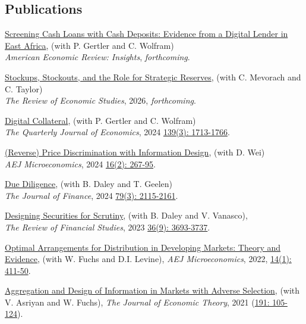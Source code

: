 \documentclass[margin,line,11pt]{resume}
\begin{document}
\begin{resume}
    \section{\mysidestyle Publications }

    \href{https://papers.ssrn.com/abstract=6439659}{Screening Cash Loans with Cash Deposits: Evidence from a Digital Lender in East Africa}, (with P. Gertler and C. Wolfram) \\
\emph{American Economic Review: Insights}, \emph{forthcoming}.


    \href{https://papers.ssrn.com/sol3/papers.cfm?abstract_id=4491921}{Stockups, Stockouts, and the Role for Strategic Reserves}, (with C. Mevorach and C. Taylor) \\
\emph{The Review of Economic Studies}, 2026, \emph{forthcoming}.


    \href{https://papers.ssrn.com/sol3/papers.cfm?abstract_id=3821998}{Digital Collateral}, (with P. Gertler and C. Wolfram)
\\\emph{The Quarterly Journal of Economics}, 2024 \href{https://doi.org/10.1093/qje/qjae003}{139(3): 1713-1766}.


     \href{https://papers.ssrn.com/sol3/Papers.cfm?abstract_id=3263898}{(Reverse) Price Discrimination with Information Design}, (with D. Wei)
 \\\emph{AEJ Microeconomics}, 2024 \href{https://www.aeaweb.org/articles?id=10.1257/mic.20220242}{16(2): 267-95}.


    \href{https://papers.ssrn.com/sol3/papers.cfm?abstract_id=3702560}{Due Diligence}, (with B. Daley and T. Geelen)
\\\emph{The Journal of Finance}, 2024 \href{https://doi.org/10.1111/jofi.13322}{79(3): 2115-2161}.


\href{https://papers.ssrn.com/sol3/papers.cfm?abstract_id=2940791}{Designing Securities for Scrutiny}, (with B. Daley and V. Vanasco), \\\emph{The Review of Financial Studies}, 2023 \href{https://doi.org/10.1093/rfs/hhad013}{36(9): 3693-3737}.


\href{https://papers.ssrn.com/sol3/papers.cfm?abstract_id=2957288}{Optimal Arrangements for Distribution in Developing Markets: Theory and Evidence},  (with W. Fuchs and D.I. Levine), \emph{AEJ Microeconomics}, 2022, \href{https://www.aeaweb.org/articles?id=10.1257/mic.20190085}{14(1): 411-50}. 

    \href{https://papers.ssrn.com/sol3/papers.cfm?abstract_id=2959043}{Aggregation and Design of Information in Markets with Adverse Selection}, (with V. Asriyan and W. Fuchs), \emph{The Journal of Economic Theory}, 2021 (\href{https://www.sciencedirect.com/science/article/pii/S0022053120301174?via%3Dihub}{191: 105-124}).


\end{resume}
\end{document}
